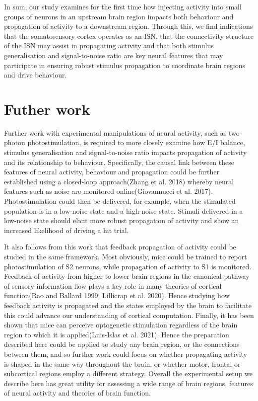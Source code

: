 In sum, our study examines for the first time how injecting activity into small groups of neurons in an upstream brain region impacts both behaviour and propagation of activity to a downstream region. Through this, we find indications that the somatosensory cortex operates as an ISN, that the connectivity structure of the ISN may assist in propagating activity and that both stimulus generalisation and signal-to-noise ratio are key neural features that may participate in ensuring robust stimulus propagation to coordinate brain regions and drive behaviour. 

\section{Futher work}
Further work with experimental manipulations of neural activity, such as two-photon photostimulation, is required to more closely examine how E/I balance, stimulus generalisation and signal-to-noise ratio impacts propagation of activity and its relationship to behaviour. Specifically, the causal link between these features of neural activity, behaviour and propagation could be further established using a closed-loop approach(Zhang et al. 2018) whereby neural features such as noise are monitored online(Giovannucci et al. 2017). Photostimulation could then be delivered, for example, when the stimulated population is in a low-noise state and a high-noise state. Stimuli delivered in a low-noise state should elicit more robust propagation of activity and show an increased likelihood of driving a hit trial.  

It also follows from this work that feedback propagation of activity could be studied in the same framework. Most obviously, mice could be trained to report photostimulation of S2 neurons, while propagation of activity to S1 is monitored. Feedback of activity from higher to lower brain regions in the canonical pathway of sensory information flow plays a key role in many theories of cortical function(Rao and Ballard 1999; Lillicrap et al. 2020). Hence studying how feedback activity is propagated and the states employed by the brain to facilitate this could advance our understanding of cortical computation. Finally, it has been shown that mice can perceive optogenetic stimulation regardless of the brain region to which it is applied(Luis-Islas et al. 2021). Hence the preparation described here could be applied to study any brain region, or the connections between them, and so further work could focus on whether propagating activity is shaped in the same way throughout the brain, or whether motor, frontal or subcortical regions employ a different strategy. Overall the experimental setup we describe here has great utility for assessing a wide range of brain regions, features of neural activity and theories of brain function.



